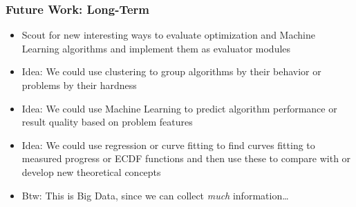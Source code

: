 \begin{frame}%
\frametitle{Future Work: Long-Term}%
\begin{itemize}%
\item Scout for new interesting ways to evaluate optimization and Machine Learning algorithms and implement them as evaluator modules%
\item<3-> Idea: We could use clustering to group algorithms by their behavior or problems by their hardness%
\item<4-> Idea: We could use Machine Learning to predict algorithm performance or result quality based on problem features%
\item<5-> Idea: We could use regression or curve fitting to find curves fitting to measured progress or ECDF functions and then use these to compare with or develop new theoretical concepts%
\item<6-> Btw: This is Big Data, since we can collect \emph{much} information\dots%
\end{itemize}%
\end{frame}%
%